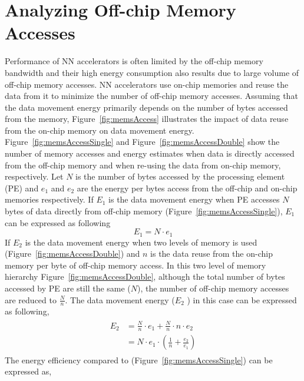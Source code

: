 \graphicspath{{./Ch2-AnalyticalFw/images/}}

\chapter{Analyzing Off-chip Memory Accesses} \label{chap:analyticalFw}
Performance of NN accelerators is often limited by the off-chip memory bandwidth and their high energy consumption also results due to large volume of off-chip memory accesses. NN accelerators use on-chip memories and reuse the data from it to minimize the number of off-chip memory accesses. Assuming that the data movement energy primarily depends on the number of bytes accessed from the memory, Figure~\ref{fig:memsAccess} illustrates the impact of data reuse from the on-chip memory on data movement energy. Figure~\ref{fig:memsAccessSingle} and Figure~\ref{fig:memsAccessDouble} show the number of memory accesses and energy estimates when data is directly accessed from the off-chip memory and when re-using the data from on-chip memory, respectively. Let $N$ is the number of bytes accessed by the processing element (PE) and $e_{1}$ and $e_{2}$ are the energy per bytes access from the off-chip and on-chip memories respectively. If $E_1$ is the data movement energy when PE accesses $N$ bytes of data directly from off-chip memory (Figure~\ref{fig:memsAccessSingle}), $E_1$ can be expressed as following
\begin{equation}\label{eq:E_1} 
	E_{1}= N\cdot e_1
\end{equation}
If $E_2$ is the data movement energy when two levels of memory is used (Figure~\ref{fig:memsAccessDouble}) and $n$ is the data reuse from the on-chip memory per byte of off-chip memory access. In this two level of memory hierarchy Figure~\ref{fig:memsAccessDouble}, although the total number of bytes accessed by PE are still the same ($N$), the number of off-chip memory accesses are reduced to $\frac{N}{n}$. The data movement energy ($E_2$ ) in this case can be expressed as following,
\begin{align}\label{eq:E_2}
	\begin{split}
	E_{2}&= \frac{N}{n}\cdot e_1 + \frac{N}{n}\cdot n\cdot e_2 \\
	&= N\cdot e_1\cdot (\frac{1}{n}+ \frac{e_2}{e_1})
	\end{split}
\end{align}
The energy efficiency compared to (Figure~\ref{fig:memsAccessSingle}) can be expressed as, 

